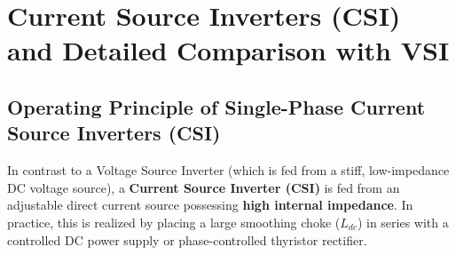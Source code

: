 \documentclass[11pt,a4paper]{article}
\begin{document}
\section{Current Source Inverters (CSI) and Detailed Comparison with VSI}

\subsection{Operating Principle of Single-Phase Current Source Inverters (CSI)}

In contrast to a Voltage Source Inverter (which is fed from a stiff, low-impedance DC voltage source), a \textbf{Current Source Inverter (CSI)} is fed from an adjustable direct current source possessing \textbf{high internal impedance}. In practice, this is realized by placing a large smoothing choke ($L_{dc}$) in series with a controlled DC power supply or phase-controlled thyristor rectifier.
\end{document}
